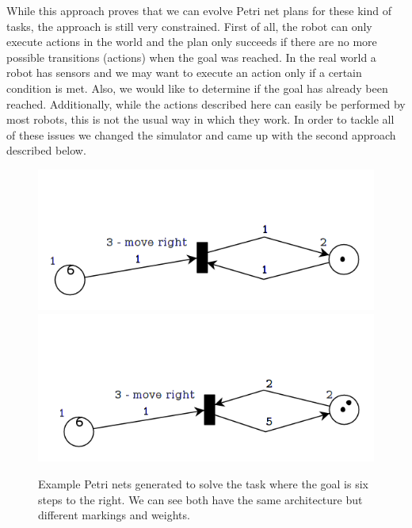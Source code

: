\documentclass[12pt,a4paper,twocolumn]{article}
\begin{document}
While this approach proves that we can evolve Petri net plans for these kind of tasks, the approach is still very constrained. First of all, the robot can only execute actions in the world and the plan only succeeds if there are no more possible transitions (actions) when the goal was reached. In the real world a robot has sensors and we may want to execute an action only if a certain condition is met. Also, we would like to determine if the goal has already been reached. Additionally, while the actions described here can easily be performed by most robots, this is not the usual way in which they work. In order to tackle all of these issues we changed the simulator and came up with the second approach described below. 

\begin{figure} [h]
\centering
\includegraphics[scale=0.3, trim = 0 5mm 0 30mm, clip = true]{PetriNet_1_1}
\includegraphics[scale=0.3, trim = 0 5mm 0 35mm, clip = true]{PetriNet_1_2}
\caption{Example Petri nets generated to solve the task where the goal is six steps to the right. We can see both have the same architecture but different markings and weights.}
\label{fig:pn1_1}
\end{figure}
\end{document}
